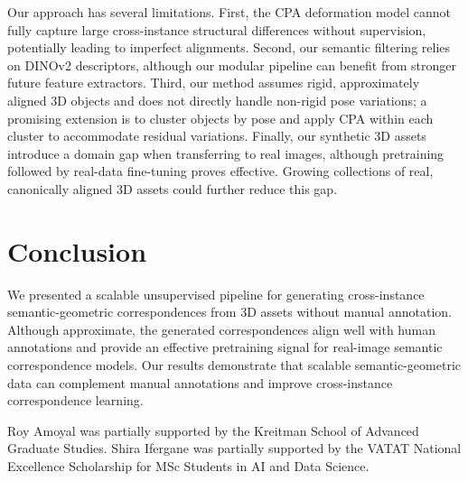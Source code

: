 \documentclass{article}
\begin{document}
Our approach has several limitations. First, the CPA deformation model cannot fully capture large cross-instance structural differences without supervision, potentially leading to imperfect alignments. Second, our semantic filtering relies on DINOv2 descriptors, although our modular pipeline can benefit from stronger future feature extractors. Third, our method assumes rigid, approximately aligned 3D objects and does not directly handle non-rigid pose variations; a promising extension is to cluster objects by pose and apply CPA within each cluster to accommodate residual variations. Finally, our synthetic 3D assets introduce a domain gap when transferring to real images, although pretraining followed by real-data fine-tuning proves effective. Growing collections of real, canonically aligned 3D assets could further reduce this gap.



\section{Conclusion}

We presented a scalable unsupervised pipeline for generating cross-instance semantic-geometric correspondences from 3D assets without manual annotation. Although approximate, the generated correspondences align well with human annotations and provide an effective pretraining signal for real-image semantic correspondence models. Our results demonstrate that scalable semantic-geometric data can complement manual annotations and improve cross-instance correspondence learning.

\begin{ack}
\begin{flushleft}
Roy Amoyal was partially supported by the Kreitman School of Advanced
Graduate Studies. Shira Ifergane was partially supported by the VATAT
National Excellence Scholarship for MSc Students in AI and Data Science.
\end{flushleft}
\end{ack}
{\small


}

\clearpage
\appendix


\clearpage

% 
\end{document}
